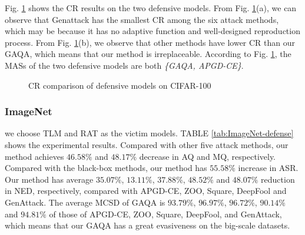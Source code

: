 \documentclass[lettersize,journal]{IEEEtran}
\begin{document}
	Fig. \ref{fig:cr_cifar100} shows the CR results on the two defensive models.  From Fig. \ref{fig:cr_cifar100}(a), we can observe that Genattack has the smallest CR among the six attack methods, which may be because it has no adaptive function and well-designed reproduction process. From Fig. \ref{fig:cr_cifar100}(b), we observe that other methods have lower CR than our GAQA, which means that our method is irreplaceable. According to Fig. \ref{fig:cr_cifar100}, the MASs of the two defensive models are both \emph{\{GAQA, APGD-CE\}}. 
	
	\begin{figure}[t]
		\centering
		
		\caption{CR comparison of defensive models on CIFAR-100 }
		\label{fig:cr_cifar100}
	\end{figure}
	
	
	
	
	
	\subsubsection{ImageNet}
	we choose TLM \cite{salman2020adversarially} and RAT \cite{wong2020fast} as the victim models. TABLE \ref{tab:ImageNet-defense} shows the experimental results. Compared with other five attack methods, our method achieves $46.58\%$ and $48.17\%$  decrease in AQ and MQ, respectively. Compared with the black-box methods, our method has $55.58\%$ increase in ASR. Our method has average $35.07\%$, $13.11\%$, $37.88\%$, $48.52\%$ and $48.07\%$ reduction in NED, respectively, compared with APGD-CE, ZOO, Square, DeepFool and GenAttack. The average MCSD of GAQA is $93.79\%$, $96.97\%$, $96.72\%$, $90.14\%$ and $94.81\%$ of those of APGD-CE, ZOO, Square, DeepFool, and GenAttack, which means that our GAQA has a great evasiveness on the big-scale datasets. 
	
\end{document}
